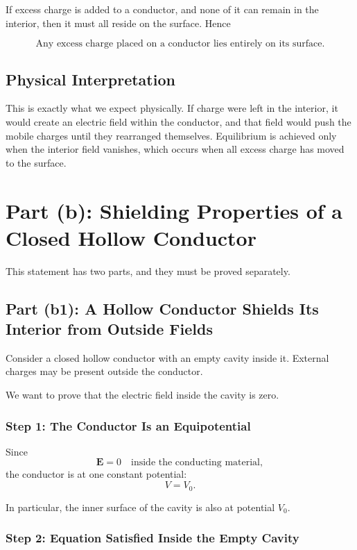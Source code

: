 \documentclass[hidelinks]{article}
\begin{document}
If excess charge is added to a conductor, and none of it can remain in the interior, then it must all reside on the surface. Hence

\[
\boxed{\text{Any excess charge placed on a conductor lies entirely on its surface.}}
\]

\subsection{Physical Interpretation}

This is exactly what we expect physically. If charge were left in the interior, it would create an electric field within the conductor, and that field would push the mobile charges until they rearranged themselves. Equilibrium is achieved only when the interior field vanishes, which occurs when all excess charge has moved to the surface.

\section{Part (b): Shielding Properties of a Closed Hollow Conductor}

This statement has two parts, and they must be proved separately.

\subsection{Part (b1): A Hollow Conductor Shields Its Interior from Outside Fields}

Consider a closed hollow conductor with an empty cavity inside it. External charges may be present outside the conductor.

We want to prove that the electric field inside the cavity is zero.

\subsubsection{Step 1: The Conductor Is an Equipotential}

Since
\[
\mathbf{E}=0
\quad \text{inside the conducting material},
\]
the conductor is at one constant potential:
\[
V=V_0.
\]

In particular, the inner surface of the cavity is also at potential $V_0$.

\subsubsection{Step 2: Equation Satisfied Inside the Empty Cavity}
\end{document}
